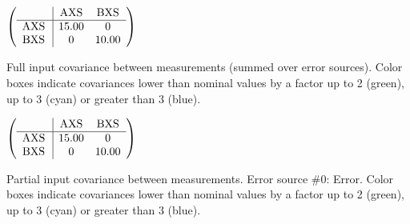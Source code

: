 \begin{table}[H]
\scriptsize
\begin{center}
\renewcommand{\arraystretch}{1.1}
\begin{math}\left(\begin{array}{c|cc}
 & \mathrm{AXS} & 
\mathrm{BXS} \\
\hline
\mathrm{AXS} \hspace*{2pt} &      15.00 &  0 \\
\mathrm{BXS} \hspace*{2pt} &  0 &      10.00 \\
\end{array}\right)\end{math}
\caption{Full input covariance between measurements (summed over error sources). Color boxes indicate covariances lower than nominal values by a factor up to 2 (green), up to 3 (cyan) or greater than 3 (blue).}
\renewcommand{\arraystretch}{1}
\end{center}
\end{table}
\begin{table}[H]
\scriptsize
\begin{center}
\renewcommand{\arraystretch}{1.1}
\begin{math}\left(\begin{array}{c|cc}
 & \mathrm{AXS} & 
\mathrm{BXS} \\
\hline
\mathrm{AXS} \hspace*{2pt} &      15.00 &  0 \\
\mathrm{BXS} \hspace*{2pt} &  0 &      10.00 \\
\end{array}\right)\end{math}
\caption{Partial input covariance between measurements. Error source \#0: Error. Color boxes indicate covariances lower than nominal values by a factor up to 2 (green), up to 3 (cyan) or greater than 3 (blue).}
\renewcommand{\arraystretch}{1}
\end{center}
\end{table}
